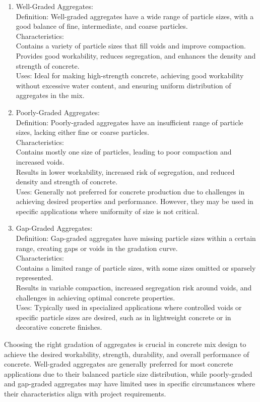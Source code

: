 \documentclass[a4paper,11pt]{book}
\begin{document}
\begin{enumerate}

\item Well-Graded Aggregates:
\\ Definition: Well-graded aggregates have a wide range of particle
sizes, with a good balance of fine, intermediate, and coarse
particles.
\\ Characteristics:
\\Contains a variety of particle sizes that fill voids and
improve compaction.
\\Provides good workability, reduces segregation, and
enhances the density and strength of concrete.
\\ Uses: Ideal for making high-strength concrete, achieving good
workability without excessive water content, and ensuring uniform
distribution of aggregates in the mix.
\item  Poorly-Graded Aggregates:
\\ Definition: Poorly-graded aggregates have an insufficient range of
particle sizes, lacking either fine or coarse particles.
\\ Characteristics:
\\ Contains mostly one size of particles, leading to poor
compaction and increased voids.
\\ Results in lower workability, increased risk of segregation,
and reduced density and strength of concrete.
\\ Uses: Generally not preferred for concrete production due to
challenges in achieving desired properties and performance.
However, they may be used in specific applications where
uniformity of size is not critical.
\item  Gap-Graded Aggregates:
\\ Definition: Gap-graded aggregates have missing particle sizes
within a certain range, creating gaps or voids in the gradation
curve.
\\ Characteristics:
\\ Contains a limited range of particle sizes, with some sizes
omitted or sparsely represented.
\\ Results in variable compaction, increased segregation risk
around voids, and challenges in achieving optimal concrete
properties.
\\ Uses: Typically used in specialized applications where controlled
voids or specific particle sizes are desired, such as in lightweight
concrete or in decorative concrete finishes.
\end{enumerate}
Choosing the right gradation of aggregates is crucial in concrete mix design to
achieve the desired workability, strength, durability, and overall performance of
concrete. Well-graded aggregates are generally preferred for most concrete
applications due to their balanced particle size distribution, while poorly-graded
and gap-graded aggregates may have limited uses in specific circumstances
where their characteristics align with project requirements.
\end{document}
